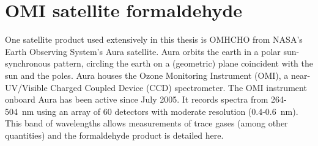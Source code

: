       
      


\section{OMI satellite formaldehyde}
\label{Model:omhcho}
  
  One satellite product used extensively in this thesis is OMHCHO from NASA's Earth Observing System's Aura satellite. %
  Aura orbits the earth in a polar sun-synchronous pattern, circling the earth on a (geometric) plane coincident with the sun and the poles.
  Aura houses the Ozone Monitoring Instrument (OMI), a near-UV/Visible Charged Coupled Device (CCD) spectrometer.
  The OMI instrument onboard Aura has been active since July 2005.
  It records spectra from 264-504~nm using an array of 60 detectors with moderate resolution (0.4-0.6~nm).
  This band of wavelengths allows measurements of trace gases (among other quantities) and the formaldehyde product is detailed here.
  
